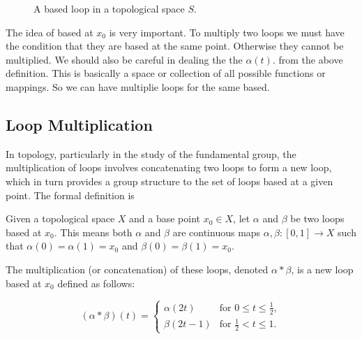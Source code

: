 \documentclass{article}
\begin{document}
\begin{figure}
\centering
{}
\caption{A based loop in a topological space $S$.}
\label{fig:based-loop}
\end{figure}

The idea of based at \( x_0 \) is very important. To multiply two loops we must have the condition that they are based at the same point. Otherwise they cannot be multiplied. We should also be careful in dealing the the \( \alpha(t) \). from the above definition. This is basically a space or collection of all possible functions or mappings. So we can have multiplie loops for the same based. 

\subsection{Loop Multiplication}
In topology, particularly in the study of the fundamental group, the multiplication of loops involves concatenating two loops to form a new loop, which in turn provides a group structure to the set of loops based at a given point. The formal definition is 

\begin{theorem}
Given a topological space \( X \) and a base point \( x_0 \in X \), let \(\alpha\) and \(\beta\) be two loops based at \( x_0 \). This means both \(\alpha\) and \(\beta\) are continuous maps \(\alpha, \beta: [0, 1] \to X\) such that \(\alpha(0) = \alpha(1) = x_0\) and \(\beta(0) = \beta(1) = x_0\).

The multiplication (or concatenation) of these loops, denoted \(\alpha * \beta\), is a new loop based at \( x_0 \) defined as follows:

\[
(\alpha * \beta)(t) = 
\begin{cases} 
\alpha(2t) & \text{for } 0 \leq t \leq \frac{1}{2}, \\
\beta(2t - 1) & \text{for } \frac{1}{2} < t \leq 1.
\end{cases}
\]
\end{theorem}
\end{document}
